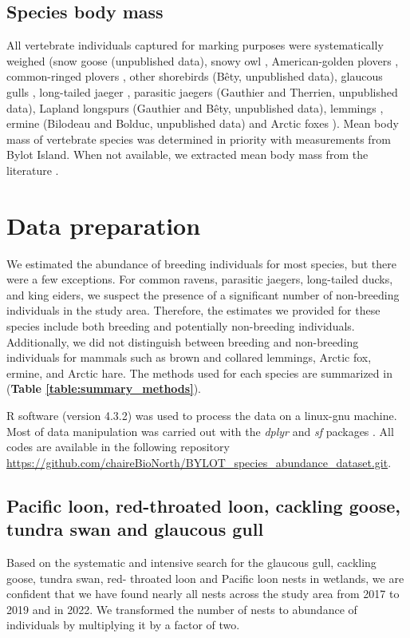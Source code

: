 \documentclass[a4paper,twoside,10pt]{article}
\begin{document}
\subsection{Species body mass}
All vertebrate individuals captured for marking purposes were systematically weighed (snow goose (unpublished data), snowy owl \citep{therrien2012, robillard2018}, American-golden plovers \citep{lamarre2021},  common-ringed plovers \citep{leandri2019}, other shorebirds (Bêty, unpublished data), glaucous gulls \citep{gauthier2015}, long-tailed jaeger \citep{seyer2019}, parasitic jaegers (Gauthier and Therrien, unpublished data), Lapland longspurs (Gauthier and Bêty, unpublished data), lemmings \citep{gauthier2020lemmings}, ermine (Bilodeau and Bolduc, unpublished data) and Arctic foxes \citep{lai2015}). Mean body mass of vertebrate species was determined in priority with measurements from Bylot Island. When not available, we extracted mean body mass from the literature \citep{wilman2014}.


\newpage

\section{Data preparation}
We estimated the abundance of breeding individuals for most species, but there were a few exceptions. For common ravens, parasitic jaegers, long-tailed ducks, and king eiders, we suspect the presence of a significant number of non-breeding individuals in the study area. Therefore, the estimates we provided for these species include both breeding and potentially non-breeding individuals. Additionally, we did not distinguish between breeding and non-breeding individuals for mammals such as brown and collared lemmings, Arctic fox, ermine, and Arctic hare. The methods used for each species are summarized in (\textbf{Table \ref{table:summary_methods}}).

R software (version 4.3.2) was used to process the data on a linux-gnu machine. Most of data manipulation was carried out with the \textit{dplyr} \citep{dplyr} and \textit{sf} packages \citep{sf}. All codes are available in the following repository \url{https://github.com/chaireBioNorth/BYLOT_species_abundance_dataset.git}.
\newpage


\newpage

\subsection{Pacific loon, red-throated loon, cackling goose, tundra swan and glaucous gull}
Based on the systematic and intensive search for the glaucous gull, cackling goose, tundra swan, red- throated loon and Pacific loon nests in wetlands, we are confident that we have found nearly all nests across the study area from 2017 to 2019 and in 2022. We transformed the number of nests to abundance of individuals by multiplying it by a factor of two. 
\end{document}
